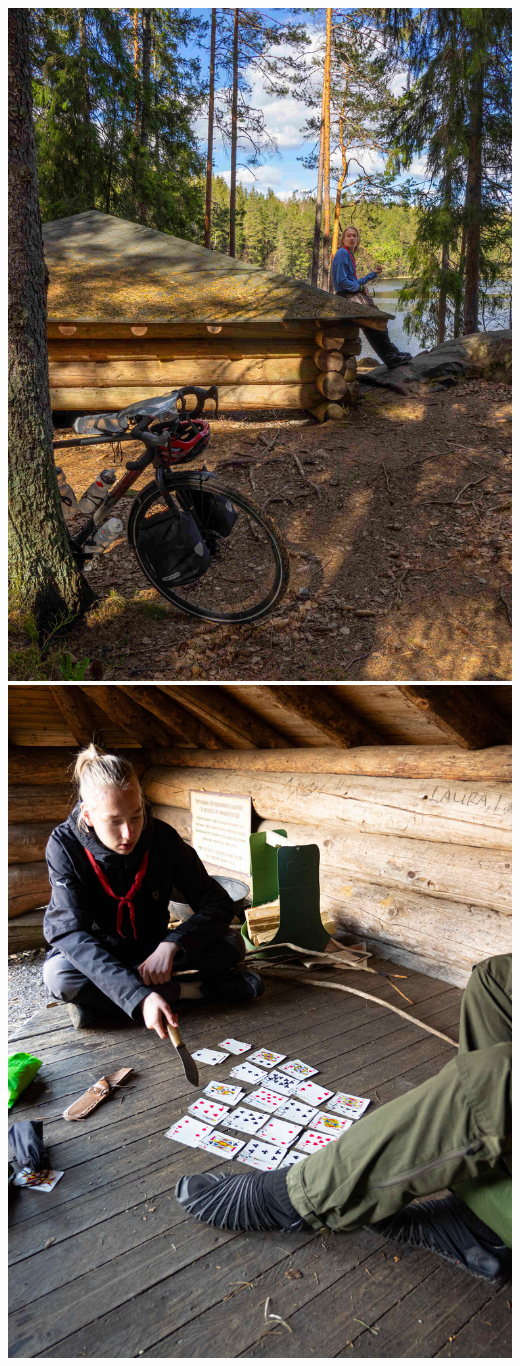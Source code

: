 \documentclass[10pt,finnish,a5paper,headings=small,twoside=semi]{scrartcl}
\begin{document}
\begin{multicols}{2}
\begin{center}
		\noindent\includegraphics[width=1.05\linewidth]{assets/pyörävaellus11}
		\noindent\includegraphics[width=1.05\linewidth]{assets/pyörävaellus15}

\end{center}
\end{multicols}
\end{document}
